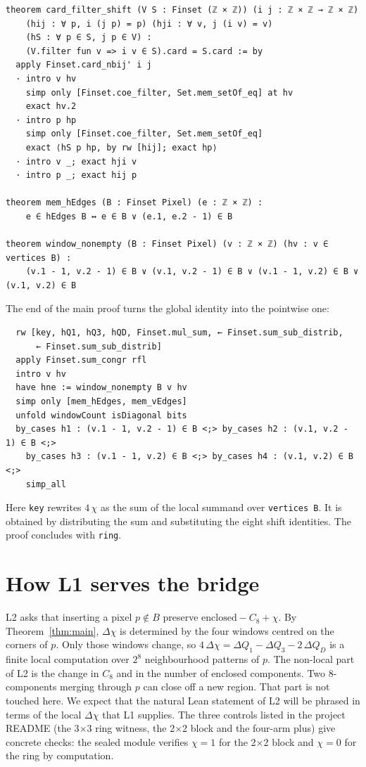 \documentclass[11pt]{article}
\theoremstyle{definition}
\theoremstyle{remark}
\begin{document}
\begin{lstlisting}
theorem card_filter_shift (V S : Finset (ℤ × ℤ)) (i j : ℤ × ℤ → ℤ × ℤ)
    (hij : ∀ p, i (j p) = p) (hji : ∀ v, j (i v) = v)
    (hS : ∀ p ∈ S, j p ∈ V) :
    (V.filter fun v => i v ∈ S).card = S.card := by
  apply Finset.card_nbij' i j
  · intro v hv
    simp only [Finset.coe_filter, Set.mem_setOf_eq] at hv
    exact hv.2
  · intro p hp
    simp only [Finset.coe_filter, Set.mem_setOf_eq]
    exact ⟨hS p hp, by rw [hij]; exact hp⟩
  · intro v _; exact hji v
  · intro p _; exact hij p

theorem mem_hEdges (B : Finset Pixel) (e : ℤ × ℤ) :
    e ∈ hEdges B ↔ e ∈ B ∨ (e.1, e.2 - 1) ∈ B

theorem window_nonempty (B : Finset Pixel) (v : ℤ × ℤ) (hv : v ∈ vertices B) :
    (v.1 - 1, v.2 - 1) ∈ B ∨ (v.1, v.2 - 1) ∈ B ∨ (v.1 - 1, v.2) ∈ B ∨ (v.1, v.2) ∈ B
\end{lstlisting}
The end of the main proof turns the global identity into the pointwise one:
\begin{lstlisting}
  rw [key, hQ1, hQ3, hQD, Finset.mul_sum, ← Finset.sum_sub_distrib,
      ← Finset.sum_sub_distrib]
  apply Finset.sum_congr rfl
  intro v hv
  have hne := window_nonempty B v hv
  simp only [mem_hEdges, mem_vEdges]
  unfold windowCount isDiagonal bits
  by_cases h1 : (v.1 - 1, v.2 - 1) ∈ B <;> by_cases h2 : (v.1, v.2 - 1) ∈ B <;>
    by_cases h3 : (v.1 - 1, v.2) ∈ B <;> by_cases h4 : (v.1, v.2) ∈ B <;>
    simp_all
\end{lstlisting}
Here \texttt{key} rewrites $4\,\chi$ as the sum of the local summand over
\texttt{vertices B}. It is obtained by distributing the sum and substituting
the eight shift identities. The proof concludes with \texttt{ring}.

\section{How L1 serves the bridge}

L2 asks that inserting a pixel $p\notin B$ preserve
$\text{enclosed} - C_8 + \chi$. By Theorem~\ref{thm:main}, $\Delta\chi$ is
determined by the four windows centred on the corners of $p$. Only those
windows change, so
$4\,\Delta\chi = \Delta Q_1 - \Delta Q_3 - 2\,\Delta Q_D$ is a finite local
computation over $2^{8}$ neighbourhood patterns of $p$. The non-local part of
L2 is the change in $C_8$ and in the number of enclosed components. Two
8-components merging through $p$ can close off a new region. That part is not
touched here. We expect that the natural Lean statement of L2 will be phrased
in terms of the local $\Delta\chi$ that L1 supplies. The three controls listed
in the project README (the 3$\times$3 ring witness, the 2$\times$2 block and
the four-arm plus) give concrete checks: the sealed module verifies
$\chi=1$ for the 2$\times$2 block and $\chi=0$ for the ring by computation.
\end{document}
